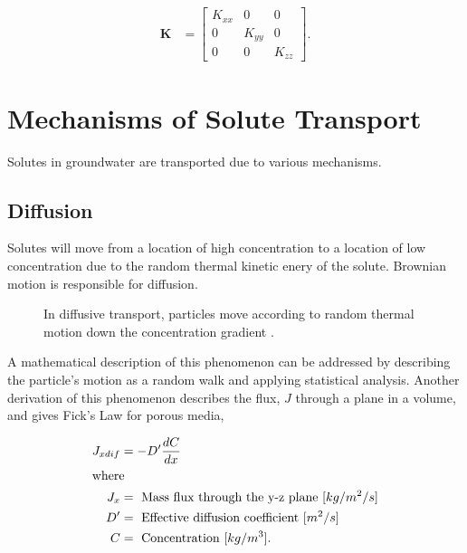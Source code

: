 \documentclass[letterpaper]{article}
\begin{document}
\begin{align}
    \textbf{K} &= \left[ \begin{array}{ccc}
                 K_{xx}  & 0       & 0  \\
                 0       & K_{yy}  & 0  \\
                 0       & 0       & K_{zz}  \end{array} \right].
  \label{conddiag}
\end{align}


\section{Mechanisms of Solute Transport}

Solutes in groundwater are transported due to various mechanisms.

\subsection{Diffusion}
\label{ss:diffusion}

Solutes will move from a location of high concentration to a location of low 
concentration due to the random thermal kinetic enery of the solute. Brownian 
motion is responsible for diffusion.

\begin{figure}[htbp!]
  \begin{center}
    \def\svgwidth{.6\textwidth}
    
  \end{center}
  \caption{In diffusive transport, particles move according to random thermal 
  motion down the concentration gradient \cite{jrpol_diffusion.svg_2011}.}
  \label{fig:Diffusion}
\end{figure}

A mathematical description of this phenomenon can be addressed by describing the 
particle's motion as a random walk and applying statistical analysis. Another 
derivation of this phenomenon describes the flux, $J$ through a plane in a 
volume, and gives Fick's Law for porous media,

\begin{align}
  J_{xdif} &= -D' \frac{dC}{dx}\nonumber\\
  \label{ficks}
  \intertext{where}
  J_x &= \mbox{ Mass flux through the y-z plane }[kg/m^2/s]\nonumber\\
  D' &= \mbox{ Effective diffusion coefficient }[m^2/s]\nonumber\\
  C &= \mbox{ Concentration }[kg/m^3].\nonumber\\
\end{align}
\end{document}
